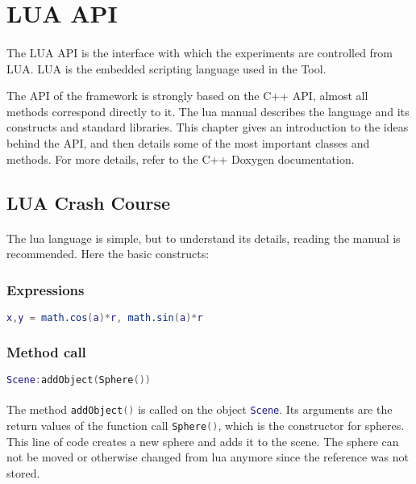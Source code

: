 \section{LUA API\label{LUAAPI}}
\paragraph{}
The LUA API is the interface with which the experiments are controlled from LUA.
LUA is the embedded scripting language used in the Tool.

The API of the framework is strongly based on the C++ API, almost all methods correspond directly to it.
The lua manual\cite{lua} describes the language and its constructs and standard libraries.
This chapter gives an introduction to the ideas behind the API, and then details some of the most important classes and methods.
For more details, refer to the C++ Doxygen documentation.


\subsection{LUA Crash Course}
\paragraph{}
The lua language is simple, but to understand its details, reading the manual\cite{lua} is recommended.
Here the basic constructs:

\subsubsection*{Expressions}

\begin{lstlisting}[language=lua]
x,y = math.cos(a)*r, math.sin(a)*r
\end{lstlisting}

\subsubsection*{Method call}
\begin{lstlisting}[language=lua]
Scene:addObject(Sphere())
\end{lstlisting}

\paragraph{}
The method \lstinline[language=lua]{addObject()} is called on the object \lstinline[language=lua]{Scene}.
Its arguments are the return values of the function call \lstinline[language=lua]{Sphere()}, which is the constructor for spheres.
This line of code creates a new sphere and adds it to the scene.
The sphere can not be moved or otherwise changed from lua anymore since the reference was not stored.

